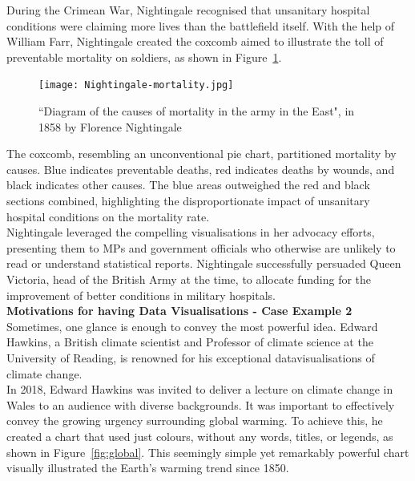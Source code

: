 \documentclass{article}\usepackage[]{graphicx}\usepackage[]{xcolor}
\begin{document}
\noindent
During the Crimean War, Nightingale recognised that unsanitary hospital conditions were claiming more lives than the battlefield itself. With the help of William Farr, Nightingale created the coxcomb aimed to illustrate the toll of preventable mortality on soldiers, as shown in Figure~\ref{fig:coxcomb}.

\begin{figure}[H]
    \centering
    \texttt{[image: Nightingale-mortality.jpg]}
    \caption{``Diagram of the causes of mortality in the army in the East", in 1858 by Florence Nightingale\cite{wikiFN}}
    \label{fig:coxcomb}
\end{figure}

\noindent 
The coxcomb, resembling an unconventional pie chart, partitioned mortality by causes. Blue indicates preventable deaths, red indicates deaths by wounds, and black indicates other causes.
The blue areas outweighed the red and black sections combined, highlighting the disproportionate impact of unsanitary hospital conditions on the mortality rate.\\

\noindent
Nightingale leveraged the compelling visualisations in her advocacy efforts, presenting them to MPs and government officials who otherwise are unlikely to read or understand statistical reports. Nightingale successfully persuaded Queen Victoria, head of the British Army at the time, to allocate funding for the improvement of better conditions in military hospitals.\\

\noindent
\textbf{Motivations for having Data Visualisations - Case Example 2}\\

\noindent
Sometimes, one glance is enough to convey the most powerful idea. Edward Hawkins, a British climate scientist and Professor of climate science at the University of Reading, is renowned for his exceptional datavisualisations of climate change.\\

\noindent
In 2018, Edward Hawkins was invited to deliver a lecture on climate change in Wales to an audience with diverse backgrounds. It was important to effectively convey the growing urgency surrounding global warming. To achieve this, he created a chart that used just colours, without any words, titles, or legends, as shown in Figure~\ref{fig:global}. This seemingly simple yet remarkably powerful chart visually illustrated the Earth's warming trend since 1850.
\end{document}
